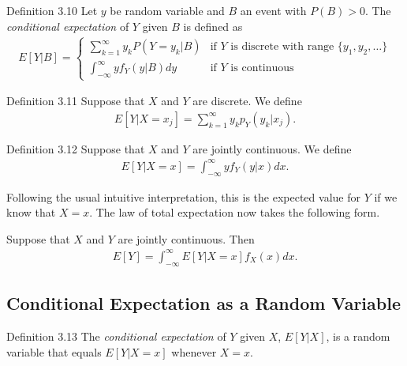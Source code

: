 \begin{boks}{Definition 3.10}
  Let $y$ be random variable and $B$ an event with $P(B)>0$. The \textit{conditional expectation} of $Y$ given $B$ is defined as
  \begin{align*}
    E[Y|B] =  \begin{cases}
                \sum_{k = 1}^\infty y_k P(Y = y_k|B) & \text{if $Y$ is discrete with range $\{y_1, y_2, \ldots\}$}\\
                \int_{-\infty}^\infty yf_Y(y|B)dy & \text{if $Y$ is continuous}
              \end{cases}
  \end{align*}
\end{boks}

\begin{boks}{Definition 3.11}
  Suppose that $X$ and $Y$ are discrete. We define
  \begin{align*}
    E[Y|X=x_j] = \sum_{k=1}^\infty y_k p_Y(y_k|x_j).
  \end{align*}
\end{boks}

\begin{boks}{Definition 3.12}
  Suppose that $X$ and $Y$ are jointly continuous. We define
  \begin{align*}
    E[Y|X = x] = \int_{-\infty}^\infty y f_Y(y|x)dx.
  \end{align*}
\end{boks}

Following the usual intuitive interpretation, this is the expected value for $Y$ if we know that $X = x$. The law of total expectation now takes the following form.

\begin{boks}
  Suppose that $X$ and $Y$ are jointly continuous. Then
  \begin{align*}
    E[Y] = \int_{-\infty}^\infty E[Y|X = x] f_X(x)dx.
  \end{align*}
\end{boks}

\subsection{Conditional Expectation as a Random Variable}

\begin{boks}{Definition 3.13}
  The \textit{conditional expectation} of $Y$ given $X$, $E[Y|X]$, is a random variable that equals $E[Y|X = x]$ whenever $X = x$.
\end{boks}

